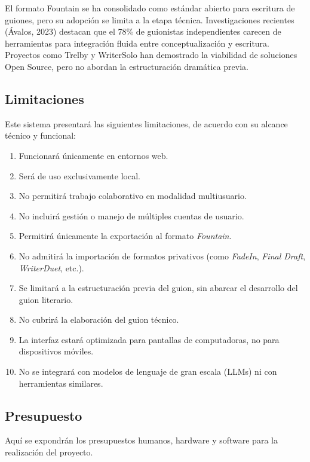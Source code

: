 \documentclass[12pt]{article}
\begin{document}
	El formato Fountain se ha consolidado como estándar abierto para escritura de guiones, pero su adopción se limita a la etapa técnica. Investigaciones recientes (Ávalos, 2023) destacan que el 78\% de guionistas independientes carecen de herramientas para integración fluida entre conceptualización y escritura. Proyectos como Trelby y WriterSolo han demostrado la viabilidad de soluciones Open Source, pero no abordan la estructuración dramática previa.

	\newpage

	\subsection{Limitaciones}

	Este sistema presentará las siguientes limitaciones, de acuerdo con su alcance técnico y funcional:

	\begin{enumerate}[label=\arabic*., leftmargin=1.5cm, itemsep=0.8em]
		\item Funcionará únicamente en entornos web.
		\item Será de uso exclusivamente local.
		\item No permitirá trabajo colaborativo en modalidad multiusuario.
		\item No incluirá gestión o manejo de múltiples cuentas de usuario.
		\item Permitirá únicamente la exportación al formato \textit{Fountain}.
		\item No admitirá la importación de formatos privativos (como \textit{FadeIn}, \textit{Final Draft}, \textit{WriterDuet}, etc.).
		\item Se limitará a la estructuración previa del guion, sin abarcar el desarrollo del guion literario.
		\item No cubrirá la elaboración del guion técnico.
		\item La interfaz estará optimizada para pantallas de computadoras, no para dispositivos móviles.
		\item No se integrará con modelos de lenguaje de gran escala (LLMs) ni con herramientas similares.
	\end{enumerate}

	\newpage

	\subsection{Presupuesto}

	Aquí se expondrán los presupuestos humanos, hardware y software para la realización del proyecto.
\end{document}

